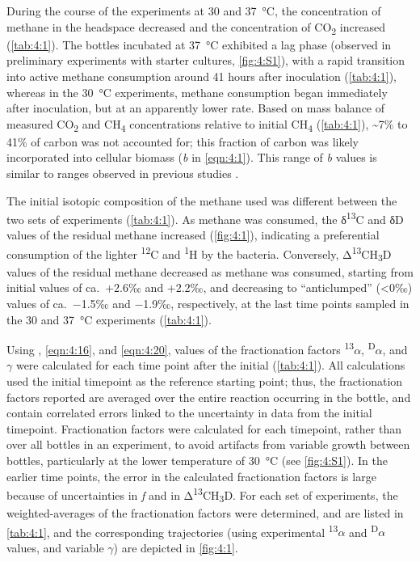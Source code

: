 During the course of the experiments at 30 and 37~°C, the concentration
of methane in the headspace decreased and the concentration of
CO\textsubscript{2} increased (\autoref{tab:4:1}). The bottles incubated at 37~°C
exhibited a lag phase (observed in preliminary experiments with starter
cultures, \autoref{fig:4:S1}), with a rapid transition into active
methane consumption around 41 hours after inoculation (\autoref{tab:4:1}), whereas
in the 30~°C experiments, methane consumption began immediately after
inoculation, but at an apparently lower rate. Based on mass balance of
measured CO\textsubscript{2} and CH\textsubscript{4} concentrations
relative to initial CH\textsubscript{4} (\autoref{tab:4:1}), \textasciitilde{}7\%
to 41\% of carbon was not accounted for; this fraction of carbon was
likely incorporated into cellular biomass (\emph{b} in \autoref{eqn:4:1}). This
range of \emph{b} values is similar to ranges observed in previous
studies \parencite[e.g., 0.1$-$0.5 in][]{Templeton++_2006_GCA}.

The initial isotopic composition of the methane used was different
between the two sets of experiments (\autoref{tab:4:1}). As methane was consumed,
the δ\textsuperscript{13}C and δD values of the residual methane
increased (\autoref{fig:4:1}), indicating a preferential consumption of the lighter
\textsuperscript{12}C and \textsuperscript{1}H by the bacteria.
Conversely, Δ\textsuperscript{13}CH\textsubscript{3}D values of the
residual methane decreased as methane was consumed, starting from
initial values of ca.\ +2.6‰ and +2.2‰, and decreasing to ``anticlumped''
(\textless{}0‰) values of ca.\ $-$1.5‰ and $-$1.9‰, respectively, at the last
time points sampled in the 30 and 37~°C experiments (\autoref{tab:4:1}).

Using , \ref{eqn:4:16}, and \ref{eqn:4:20}, values of the fractionation factors
\textsuperscript{13}$\alpha$, \textsuperscript{D}$\alpha$, and $\gamma$ were calculated for
each time point after the initial (\autoref{tab:4:1}). All calculations used the
initial timepoint as the reference starting point; thus, the
fractionation factors reported are averaged over the entire reaction
occurring in the bottle, and contain correlated errors linked to the
uncertainty in data from the initial timepoint. Fractionation factors
were calculated for each timepoint, rather than over all bottles in an
experiment, to avoid artifacts from variable growth between bottles,
particularly at the lower temperature of 30~°C (see \autoref{fig:4:S1}). In the earlier time points, the error in the calculated
fractionation factors is large because of uncertainties in \emph{f} and
in Δ\textsuperscript{13}CH\textsubscript{3}D. For each set of
experiments, the weighted-averages of the fractionation factors were
determined, and are listed in \autoref{tab:4:1}, and the corresponding
trajectories (using experimental \textsuperscript{13}$\alpha$ and
\textsuperscript{D}$\alpha$ values, and variable $\gamma$) are depicted in \autoref{fig:4:1}.

